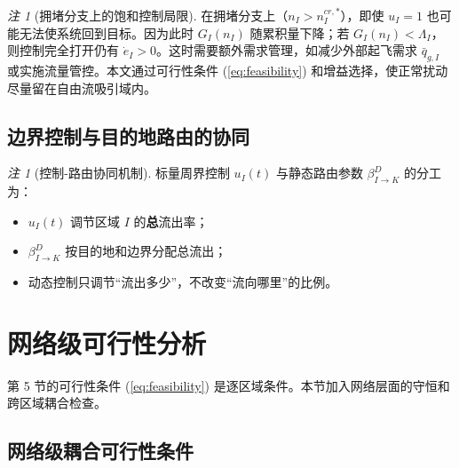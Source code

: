 \documentclass[a4paper,12pt]{article}
\theoremstyle{plain}
\theoremstyle{definition}
\theoremstyle{remark}
\newtheorem{remark}[theorem]{注}
\begin{document}
\begin{remark}[拥堵分支上的饱和控制局限]\label{rem:congested_saturation}
在拥堵分支上（$n_I > n_I^{cr,*}$），即使 $u_I = 1$ 也可能无法使系统回到目标。因为此时 $G_I(n_I)$ 随累积量下降；若 $G_I(n_I) < \Lambda_I$，则控制完全打开仍有 $\dot e_I>0$。这时需要额外需求管理，如减少外部起飞需求 $\bar q_{g,I}$ 或实施流量管控。本文通过可行性条件 (\ref{eq:feasibility}) 和增益选择，使正常扰动尽量留在自由流吸引域内。
\end{remark}

\subsection{边界控制与目的地路由的协同}

\begin{remark}[控制-路由协同机制]\label{rem:control_routing}
标量周界控制 $u_I(t)$ 与静态路由参数 $\beta_{I \to K}^D$ 的分工为：
\begin{itemize}
    \item $u_I(t)$ 调节区域 $I$ 的\textbf{总}流出率；
    \item $\beta_{I \to K}^D$ 按目的地和边界分配总流出；
    \item 动态控制只调节“流出多少”，不改变“流向哪里”的比例。
\end{itemize}
\end{remark}

\section{网络级可行性分析}

第 5 节的可行性条件 (\ref{eq:feasibility}) 是逐区域条件。本节加入网络层面的守恒和跨区域耦合检查。

\subsection{网络级耦合可行性条件}
\end{document}
